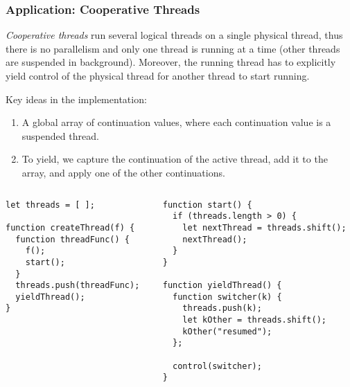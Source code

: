 \documentclass[8pt,pdf,handout]{beamer}
\begin{document}
\begin{frame}[fragile]
\frametitle{Application: Cooperative Threads}

\begin{definition} \emph{Cooperative threads} run several logical threads on a
single physical thread, thus there is no parallelism and only one thread is
running at a time (other threads are suspended in background). Moreover, the
running thread has to explicitly yield control of the physical thread for
another thread to start running.
\end{definition}

\pause

Key ideas in the implementation:

\begin{enumerate}

  \item A global array of continuation values, where each continuation value is
  a suspended thread.

  \item To yield, we capture the continuation of the active thread, add it to
  the array, and apply one of the other continuations.

\end{enumerate}

\pause

\begin{columns}

\begin{column}{0.4\textwidth}
\begin{lstlisting}
let threads = [ ];

function createThread(f) {
  function threadFunc() {
    f();
    start();
  }
  threads.push(threadFunc);
  yieldThread();
}
\end{lstlisting}
\end{column}

\begin{column}{0.55\textwidth}
\begin{lstlisting}
function start() {
  if (threads.length > 0) {
    let nextThread = threads.shift();
    nextThread();
  }
}

function yieldThread() {
  function switcher(k) {
    threads.push(k);
    let kOther = threads.shift();
    kOther("resumed");
  };

  control(switcher);
}
\end{lstlisting}
\end{column}

\end{columns}

\end{frame}
\end{document}
